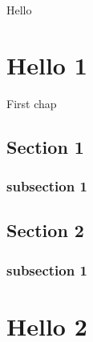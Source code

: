 \documentclass[fleqn,10pt]{book}
\begin{document}
\startcontents
{}

Hello
\chapter{Hello 1}
First chap
\section{Section 1}
\subsection{subsection 1}
\section{Section 2}
\subsection{subsection 1}

\chapter{Hello 2}
\end{document}
